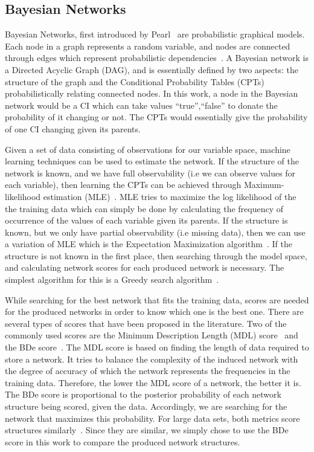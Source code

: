 \documentclass{article}
\begin{document}
\subsection{Bayesian Networks}

Bayesian Networks, first introduced by Pearl~\cite{pearl1988probabilistic} are probabilistic graphical models. Each node in a graph represents a random
variable, and nodes are connected through edges which represent probabilistic dependencies~\cite{benbayesian}. A Bayesian network is a Directed
Acyclic Graph (DAG), and is essentially defined by two aspects: the structure of the graph and the Conditional Probability Tables (CPTs) probabilistically
relating connected nodes. In this work, a node in the Bayesian network would be a CI which can take values {``true'',``false''} to donate the probability of it
changing or not. The CPTs would essentially give the probability of one CI changing given its parents.

Given a set of data consisting of observations for our variable space, machine learning techniques can be used to estimate the network. If the structure of the
network is known, and we have full observability (i.e we can observe values for each variable), then learning the CPTs can be achieved through
Maximum-likelihood estimation (MLE)~\cite{benbayesian}. MLE tries to maximize the log likelihood of the the training data which can simply be done by
calculating the frequency of occurrence of the values of each variable given its parents. If the structure is known, but we only have partial observability (i.e
missing data), then we can use a variation of MLE which is the Expectation Maximization algorithm~\cite{dempster1977maximum}. If the structure is not known in
the first place, then searching through the model space, and calculating network scores for each produced network is necessary. The simplest algorithm for this
is a Greedy search algorithm~\cite{friedman1996learning}.

While searching for the best network that fits the training data, scores are needed for the produced networks in order to know which one is the best one. There
are several types of scores that have been proposed in the literature. Two of the commonly used scores are the Minimum Description Length (MDL)
score~\cite{rissanen1986stochastic} and the BDe score~\cite{heckerman1995learning}. The MDL score is based on finding the length of data required to store a
network. It tries to balance the complexity of the induced network with the degree of accuracy of which the network represents the frequencies in the training
data. Therefore, the lower the MDL score of a network, the better it is. The BDe score is proportional to the posterior probability of each network structure
being scored, given the data. Accordingly, we are searching for the network that maximizes this probability. For large data sets, both metrics score
structures similarly~\cite{friedman1996learning}. Since they are similar, we simply chose to use the BDe score in this work to compare the produced network
structures.
\end{document}
